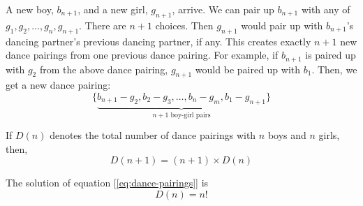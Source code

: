 \documentclass[11pt]{book}
\theoremstyle{definition}
\theoremstyle{plain}
\theoremstyle{definition}
\theoremstyle{problemstyle}
\theoremstyle{remark}
\theoremstyle{definition}
\begin{document}
A new boy, $b_{n+1}$, and a new girl, $g_{n+1}$, arrive. We can pair up $b_{n+1}$ with any of $g_1,g_2,\dots,g_{n},g_{n+1}$. There are $n+1$ choices. Then $g_{n+1}$ would pair up with $b_{n+1}$'s dancing partner's previous dancing partner, if any. This creates exactly $n+1$ new dance pairings from one previous dance pairing. For example, if $b_{n+1}$ is paired up with $g_2$ from the above dance pairing, $g_{n+1}$ would be paired up with $b_1$. Then, we get a new dance pairing:
\[
    \{\underbrace{b_{n+1}-g_2,b_2-g_3,\dots,b_n-g_m,b_1-g_{n+1}}_{n+1\text{ boy-girl pairs}}\}
\]

If $D(n)$ denotes the total number of dance pairings with $n$ boys and $n$ girls, then,
\begin{equation}
    D(n+1)=(n+1)\times D(n)
    \label{eq:dance-pairings}
\end{equation}

The solution of equation [\ref{eq:dance-pairings}] is
\[
    D(n)=n!
\]
\end{document}
